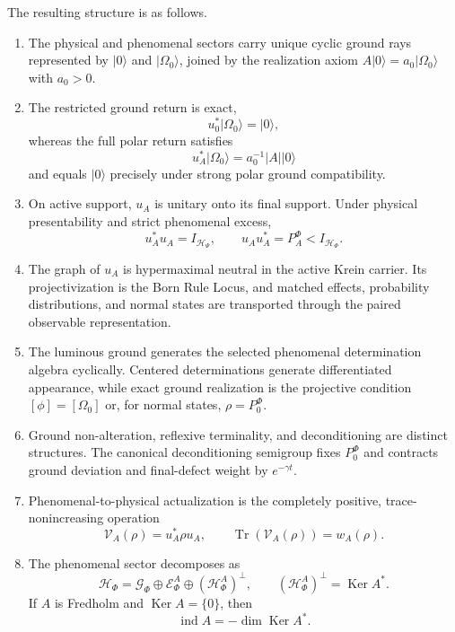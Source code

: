\documentclass[11pt,reqno]{scrartcl}
\newcommand{\scrHP}{\mathscr H_{\Psi}}
\newcommand{\scrHF}{\mathscr H_{\Phi}}
\newcommand{\PzeroF}{P_{0}^{\Phi}}
\newcommand{\GzeroF}{\mathscr G_{\Phi}}
\newcommand{\ket}[1]{\lvert #1\rangle}
\DeclareMathOperator{\Ker}{Ker}
\DeclareMathOperator{\ind}{ind}
\newcommand{\suppProjF}{P_{A}^{\Phi}}
\DeclareMathOperator{\Tr}{Tr}
\newcommand{\defectHF}{(\mathscr H_{\Phi}^{A})^{\perp}}
\newcommand{\actAppF}{\mathscr E_{\Phi}^{A}}
\newcommand{\presentWeight}{w_{A}}
\newcommand{\returnOp}{\mathcal V_{A}}
\theoremstyle{plain}
\theoremstyle{definition}
\theoremstyle{remark}
\begin{document}
The resulting structure is as follows.
\begin{enumerate}[label=(\roman*)]
  \item The physical and phenomenal sectors carry unique cyclic ground rays
  represented by $\ket0$ and $\ket{\Omega_0}$, joined by the realization
  axiom $A\ket0=a_0\ket{\Omega_0}$ with $a_0>0$.
  \item The restricted ground return is exact,
  \begin{equation}
    u_0^*\ket{\Omega_0}=\ket0,
  \end{equation}
  whereas the full polar return satisfies
  \begin{equation}
    u_A^*\ket{\Omega_0}=a_0^{-1}|A|\ket0
  \end{equation}
  and equals $\ket0$ precisely under strong polar ground compatibility.
  \item On active support, $u_A$ is unitary onto its final support.  Under
  physical presentability and strict phenomenal excess,
  \begin{equation}
    u_A^*u_A=I_{\scrHP},
    \qquad
    u_Au_A^*=\suppProjF<I_{\scrHF}.
  \end{equation}
  \item The graph of $u_A$ is hypermaximal neutral in the active Krein
  carrier.  Its projectivization is the Born Rule Locus, and matched effects,
  probability distributions, and normal states are transported through the
  paired observable representation.
  \item The luminous ground generates the selected phenomenal determination
  algebra cyclically.  Centered determinations generate differentiated
  appearance, while exact ground realization is the projective condition
  $[\phi]=[\Omega_0]$ or, for normal states, $\rho=\PzeroF$.
  \item Ground non-alteration, reflexive terminality, and deconditioning are
  distinct structures.  The canonical deconditioning semigroup fixes
  $\PzeroF$ and contracts ground deviation and final-defect weight by
  $e^{-\gamma t}$.
  \item Phenomenal-to-physical actualization is the completely positive,
  trace-nonincreasing operation
  \begin{equation}
    \returnOp(\rho)=u_A^*\rho u_A,
    \qquad
    \Tr\!\left(\returnOp(\rho)\right)=\presentWeight(\rho).
  \end{equation}
  \item The phenomenal sector decomposes as
  \begin{equation}
    \scrHF=\GzeroF\oplus\actAppF\oplus\defectHF,
    \qquad
    \defectHF=\Ker A^*.
  \end{equation}
  If $A$ is Fredholm and $\Ker A=\{0\}$, then
  \begin{equation}
    \ind A=-\dim\Ker A^*.
  \end{equation}
\end{enumerate}
\end{document}
